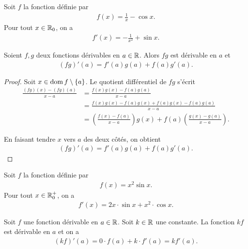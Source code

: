 \documentclass[main.tex]{subfiles}
\begin{document}
\begin{example}
    Soit $f$ la fonction définie par 
    \begin{align}
        f(x) = \frac{1}{x} - \cos x.
    \end{align}
    Pour tout $x \in \mathbb{R}_0$, on a 
    \begin{align}
        f'(x) = -\frac{1}{x^2} + \sin x.
    \end{align}
\end{example}

\begin{proposition}

    Soient $f, g$ deux fonctions dérivables en $a \in \mathbb{R}$.
    Alors $f g$ est dérivable en $a$ et
    \begin{align}
        (f g)'(a) = f'(a) g(a) + f(a) g'(a).
    \end{align}
\end{proposition}
\begin{proof}
    Soit $x \in \operatorname{dom} f \setminus \{a\}$.
    Le quotient différentiel de $f g$ s'écrit
    \begin{align}
        \frac {(f g)(x) - (f g)(a)} {x - a}
        &= \frac {f(x) g(x) - f(a) g(a)} {x - a}\\
        &= \frac {f(x) g(x) - f(a) g(x) + f(a) g(x) - f(a) g(a)} {x - a}\\
        &= \left(\frac {f(x) - f(a)} {x - a}\right) g(x) + f(a) \left(\frac {g(x) - g(a)} {x - a}\right).
    \end{align}

    En faisant tendre $x$ vers $a$ des deux côtés,
    on obtient
    \begin{align}
        (f g)'(a) = f'(a) g(a) + f(a) g'(a).
    \end{align}
\end{proof}

\begin{example}
    Soit $f$ la fonction définie par 
    \begin{align}
        f(x) = x^2 \sin x.
    \end{align}
    Pour tout $x \in \mathbb{R}_0^+$, on a 
    \begin{align}
        f'(x) = 2x \cdot \sin x + x^2 \cdot \cos x.
    \end{align}
\end{example}

\begin{example}
    [Dérivée de $k f(x)$]
    Soit $f$ une fonction dérivable en $a \in \mathbb{R}$.
    Soit $k \in \mathbb{R}$ une constante. 
    La fonction $kf$ est dérivable en $a$ et on a 
    \begin{align}
        (kf)'(a) = 0 \cdot f(a) + k \cdot f'(a) = kf'(a).
    \end{align}
\end{example}
\end{document}
